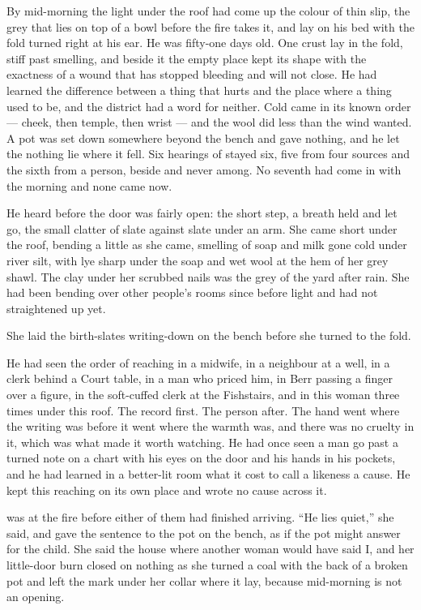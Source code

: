 
By mid-morning the light under the  roof had come up the colour of thin slip, the grey that lies on top of a bowl before the fire takes it, and  lay on his bed with the fold turned right at his ear. He was fifty-one days old. One crust lay in the fold, stiff past smelling, and beside it the empty place kept its shape with the exactness of a wound that has stopped bleeding and will not close. He had learned the difference between a thing that hurts and the place where a thing used to be, and the district had a word for neither. Cold came in its known order --- cheek, then temple, then wrist --- and the wool did less than the wind wanted. A pot was set down somewhere beyond the bench and gave nothing, and he let the nothing lie where it fell. Six hearings of  stayed six, five from four sources and the sixth from a person, beside and never among. No seventh had come in with the morning and none came now.

He heard  before the door was fairly open: the short step, a breath held and let go, the small clatter of slate against slate under an arm. She came short under the roof, bending a little as she came, smelling of soap and milk gone cold under river silt, with lye sharp under the soap and wet wool at the hem of her grey shawl. The clay under her scrubbed nails was the grey of the yard after rain. She had been bending over other people's rooms since before light and had not straightened up yet.

She laid the birth-slates writing-down on the bench before she turned to the fold.

He had seen the order of reaching in a midwife, in a neighbour at a well, in a clerk behind a Court table, in a man who priced him, in Berr passing a finger over a figure, in the soft-cuffed clerk at the Fishstairs, and in this woman three times under this roof. The record first. The person after. The hand went where the writing was before it went where the warmth was, and there was no cruelty in it, which was what made it worth watching. He had once seen a man go past a turned note on a chart with his eyes on the door and his hands in his pockets, and he had learned in a better-lit room what it cost to call a likeness a cause. He kept this reaching on its own place and wrote no cause across it.

 was at the fire before either of them had finished arriving. “He lies quiet,” she said, and gave the sentence to the pot on the bench, as if the pot might answer for the child. She said the house where another woman would have said I, and her little-door burn closed on nothing as she turned a coal with the back of a broken pot and left the mark under her collar where it lay, because mid-morning is not an opening.

